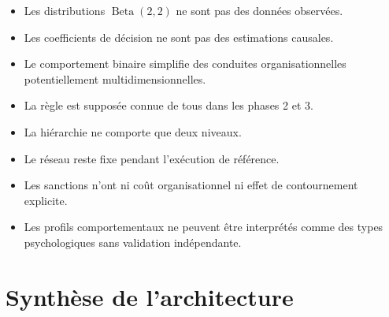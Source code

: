 \documentclass[11pt,a4paper]{article}
\begin{document}
\begin{itemize}
  \item Les distributions $\operatorname{Beta}(2,2)$ ne sont pas des données
  observées.
  \item Les coefficients de décision ne sont pas des estimations causales.
  \item Le comportement binaire simplifie des conduites organisationnelles
  potentiellement multidimensionnelles.
  \item La règle est supposée connue de tous dans les phases 2 et 3.
  \item La hiérarchie ne comporte que deux niveaux.
  \item Le réseau reste fixe pendant l’exécution de référence.
  \item Les sanctions n’ont ni coût organisationnel ni effet de contournement
  explicite.
  \item Les profils comportementaux ne peuvent être interprétés comme des types
  psychologiques sans validation indépendante.
\end{itemize}

\section{Synthèse de l’architecture}
\end{document}
